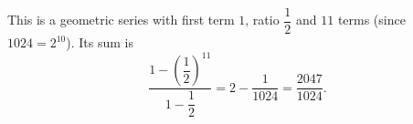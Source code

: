 This is a geometric series with first term $1$, ratio $\dfrac{1}{2}$ and $11$ terms (since $1024=2^{10}$). Its sum is
\[
\dfrac{1-\left(\dfrac{1}{2}\right)^{11}}{1-\dfrac{1}{2}}=2-\dfrac{1}{1024}=\boxed{\dfrac{2047}{1024}} .
\]
